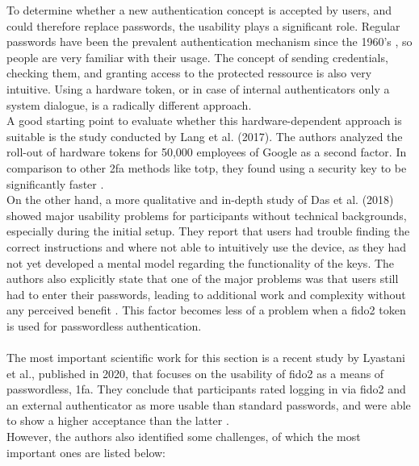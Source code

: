 To determine whether a new authentication concept is accepted by users, and could therefore replace passwords, the usability plays a significant role. Regular passwords have been the prevalent authentication mechanism since the 1960's \cite{mcmillan2012}, so people are very familiar with their usage. The concept of sending credentials, checking them, and granting access to the protected ressource is also very intuitive. Using a hardware token, or in case of internal authenticators only a system dialogue, is a radically different approach.\\
A good starting point to evaluate whether this hardware-dependent approach is suitable is the study conducted by Lang et al. (2017). The authors analyzed the roll-out of hardware tokens for 50,000 employees of Google as a second factor. In comparison to other \ac{2fa} methods like \ac{totp}, they found using a security key to be significantly faster \cite{lang2017}.\\
On the other hand, a more qualitative and in-depth study of Das et al. (2018) showed major usability problems for participants without technical backgrounds, especially during the initial setup. They report that users had trouble finding the correct instructions and where not able to intuitively use the device, as they had not yet developed a mental model regarding the functionality of the keys. The authors also explicitly state that one of the major problems was that users still had to enter their passwords, leading to additional work and complexity without any perceived benefit \cite{das2018}. This factor becomes less of a problem when a \ac{fido2} token is used for passwordless authentication.\\
\\
The most important scientific work for this section is a recent study by Lyastani et al., published in 2020, that focuses on the usability of \ac{fido2} as a means of passwordless, \ac{1fa}. They conclude that participants rated logging in via \ac{fido2} and an external authenticator as more usable than standard passwords, and were able to show a higher acceptance than the latter \cite{lyastani2020}.\\
However, the authors also identified some challenges, of which the most important ones are listed below:

